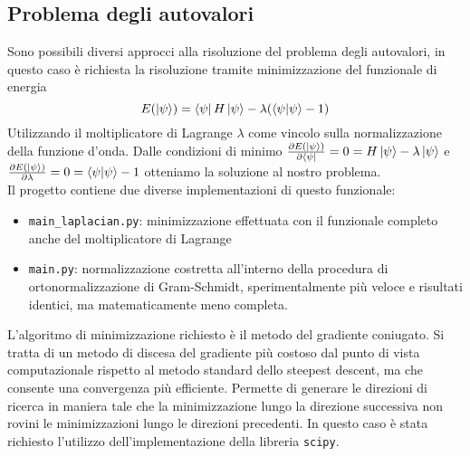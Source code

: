 \documentclass{article}
\begin{document}
\subsection{Problema degli autovalori}
Sono possibili diversi approcci alla risoluzione del problema degli autovalori, in questo caso è richiesta la risoluzione tramite minimizzazione del 
funzionale di energia 
\begin{equation}
    E(\ket{\psi})=\bra{\psi} H \ket{\psi} - \lambda(\langle \psi|\psi \rangle-1)
\end{equation}
Utilizzando il moltiplicatore di Lagrange $\lambda$ come vincolo sulla normalizzazione della funzione d'onda. 
Dalle condizioni di minimo $\frac{\partial E(\ket{\psi})}{\partial \bra{\psi}}=0=H\ket{\psi}-\lambda\ket{\psi}$ e $\frac{\partial E(\ket{\psi})}{\partial \lambda}=0=\langle \psi | \psi \rangle -1$ otteniamo la soluzione al nostro problema.
\\ Il progetto contiene due diverse implementazioni di 
questo funzionale:
\begin{itemize}
    \item \texttt{main\_laplacian.py}: minimizzazione effettuata con il funzionale completo anche del moltiplicatore di Lagrange
    \item \texttt{main.py}: normalizzazione costretta all'interno della procedura di ortonormalizzazione di Gram-Schmidt, sperimentalmente più veloce e risultati identici, ma 
matematicamente meno completa.
\end{itemize}
L'algoritmo di minimizzazione richiesto è il metodo del gradiente coniugato. Si tratta di un metodo di discesa del gradiente più costoso dal punto di vista computazionale rispetto al metodo standard dello steepest descent, ma che consente una convergenza più efficiente.
Permette di generare le direzioni di ricerca in maniera tale che la minimizzazione lungo la direzione successiva non rovini le minimizzazioni lungo le direzioni precedenti.
In questo caso è stata richiesto l'utilizzo dell'implementazione della libreria \texttt{scipy}.
\end{document}
